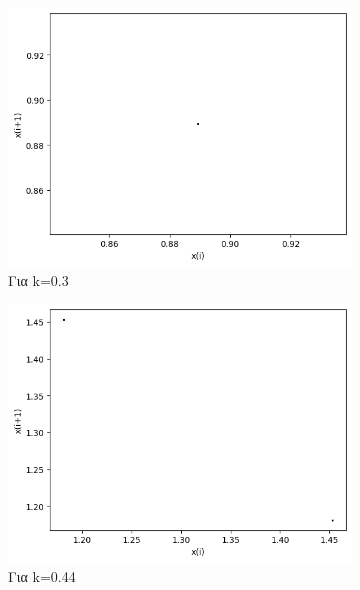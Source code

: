 \begin{figure}[h!]
	\centering	
	\begin{subfigure}[b]{0.4\textwidth}
		\centering
		\includegraphics[width=\textwidth]{LateX images/graphs q03/g3}
		\caption{Για k=0.3}
		\label{f:k15}
	\end{subfigure}
	\hfill
	\begin{subfigure}[b]{0.4\textwidth}
		\centering
		\includegraphics[width=\textwidth]{LateX images/graphs q03/g4}
		\caption{Για k=0.44}
		\label{f:k16}
	\end{subfigure}
	\hfill
	\begin{subfigure}[b]{0.4\textwidth}
		\centering

\end{subfigure}
\end{figure}

